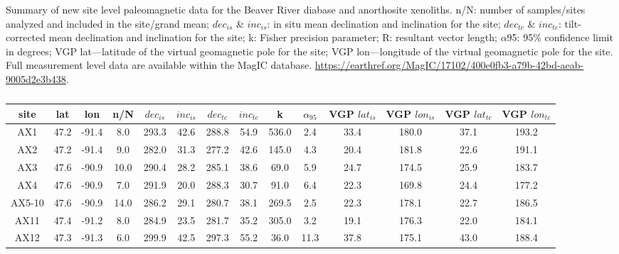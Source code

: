 \begin{table}
\scriptsize
\caption\footnotesize{Summary of new site level paleomagnetic data for the Beaver River diabase and anorthosite xenoliths. n/N: number of samples/sites analyzed and included in the site/grand mean; $dec_{is}$ \& $inc_{is}$: in situ mean declination and inclination for the site; $dec_{tc}$ \& $inc_{tc}$: tilt-corrected mean declination and inclination for the site; k: Fisher precision parameter; R: resultant vector length; $\alpha$95: 95\% confidence limit in degrees; VGP lat—latitude of the virtual geomagnetic pole for the site; VGP lon—longitude of the virtual geomagnetic pole for the site. Full measurement level data are available within the MagIC database. \url{https://earthref.org/MagIC/17102/400e0fb3-a79b-42bd-aeab-9005d2e3b438}.}
\centering
\begin{tabular}{cccccccccccccc}
\hline
site             & lat  & lon   & n/N  & $dec_{is}$ & $inc_{is}$ & $dec_{tc}$ & $inc_{tc}$ & k     & $\alpha_{95}$ & VGP $lat_{is}$ & VGP $lon_{is}$ & VGP $lat_{tc}$ & VGP $lon_{tc}$ \\
\hline
AX1              & 47.2 & -91.4 & 8.0  & 293.3   & 42.6         & 288.8   & 54.9    & 536.0 & 2.4                     & 33.4        & 180.0       & 37.1         & 193.2        \\
AX2              & 47.2 & -91.4 & 9.0  & 282.0   & 31.3         & 277.2   & 42.6    & 145.0 & 4.3                     & 20.4        & 181.8       & 22.6         & 191.1        \\
AX3              & 47.6 & -90.9 & 10.0 & 290.4   & 28.2         & 285.1   & 38.6    & 69.0  & 5.9                     & 24.7        & 174.5       & 25.9         & 183.7        \\
AX4              & 47.6 & -90.9 & 7.0  & 291.9   & 20.0         & 288.3   & 30.7    & 91.0  & 6.4                     & 22.3        & 169.8       & 24.4         & 177.2        \\
AX5-10           & 47.6 & -90.9 & 14.0 & 286.2   & 29.1         & 280.7   & 38.1    & 269.5 & 2.5                     & 22.3        & 178.1       & 22.7         & 186.5        \\
AX11             & 47.4 & -91.2 & 8.0  & 284.9   & 23.5         & 281.7   & 35.2    & 305.0 & 3.2                     & 19.1        & 176.3       & 22.0         & 184.1        \\
AX12             & 47.3 & -91.3 & 6.0  & 299.9   & 42.5         & 297.3   & 55.2    & 36.0  & 11.3                    & 37.8        & 175.1       & 43.0         & 188.4        \\

\end{tabular}
\end{table}
